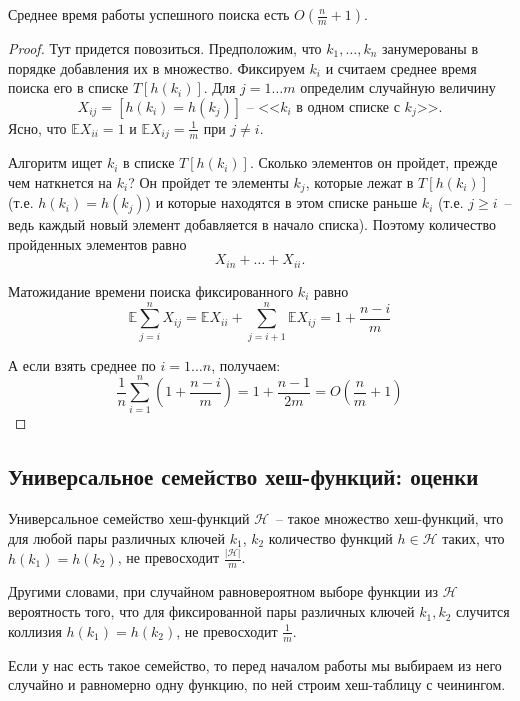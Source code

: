 \begin{theorem*}
	Среднее время работы успешного поиска есть $O\left(\frac{n}{m}+1\right)$.
\end{theorem*}
\begin{proof}
Тут придется повозиться. Предположим, что $k_1, \ldots, k_n$ занумерованы в порядке добавления их в множество. Фиксируем $k_i$ и считаем среднее время поиска его в списке $T[h(k_i)]$. Для $j=1\ldots m$ определим случайную величину $$X_{ij} = [h(k_i) = h(k_j)] \text{~-- <<$k_i$ в одном списке с $k_j$>>.}$$ Ясно, что $\mathbb E X_{ii} = 1$ и $\mathbb E X_{ij} = \frac{1}{m}$ при $j\neq i$.

Алгоритм ищет $k_i$ в списке $T[h(k_i)]$. Сколько элементов он пройдет, прежде чем наткнется на $k_i$? Он пройдет те элементы $k_j$, которые лежат в $T[h(k_i)]$ (т.е. $h(k_i)=h(k_j)$) и которые находятся в этом списке раньше $k_i$ (т.е. $j\geq i$~-- ведь каждый новый элемент добавляется в начало списка). Поэтому количество пройденных элементов равно $$X_{in} + \ldots + X_{ii}.$$

Матожидание времени поиска фиксированного $k_i$ равно $$\mathbb E \sum_{j=i}^n X_{ij} = \mathbb E X_{ii} + \sum_{j=i+1}^n \mathbb E X_{ij} = 1 + \frac{n-i}{m}$$

А если взять среднее по $i=1\ldots n$, получаем: $$\frac{1}{n} \sum_{i=1}^n\left(1+\frac{n-i}{m}\right) = 1 + \frac{n-1}{2m} = O\left(\frac{n}{m} + 1\right)$$
\end{proof}

\subsection{Универсальное семейство хеш-функций: оценки}

\begin{definition*}
	Универсальное семейство хеш-функций $\mathcal{H}$~-- такое множество хеш-функций, что для любой пары различных ключей $k_1$, $k_2$ количество функций $h \in \mathcal{H}$ таких, что $h(k_1) = h(k_2)$, не превосходит $\frac{|\mathcal{H}|}{m}$.
\end{definition*}

 Другими словами, при случайном равновероятном выборе функции из $\mathcal{H}$ вероятность того, что для фиксированной пары различных ключей $k_1, k_2$ случится коллизия $h(k_1) = h(k_2)$, не превосходит $\frac{1}{m}$.

Если у нас есть такое семейство, то перед началом работы мы выбираем из него случайно и равномерно одну функцию, по ней строим хеш-таблицу с чеинингом.


